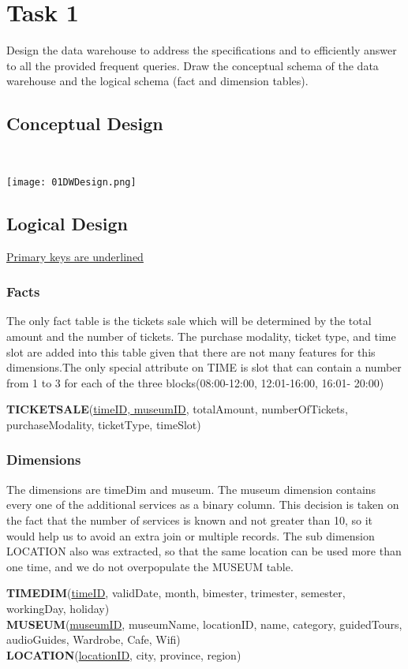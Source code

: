 \section{Task 1}

\begin{question}
    Design the data warehouse to address the specifications and to efficiently answer to all
    the provided frequent queries.
    Draw the conceptual schema of the data warehouse and the logical schema (fact and dimension tables).
\end{question}
\begin{answer}
    \subsection{Conceptual Design}
    \\
    \begin{center}
        \texttt{[image: 01DWDesign.png]}
    \end{center}
    \pagebreak
    \subsection{Logical Design}
    \underline{Primary keys are underlined}
    \subsubsection{Facts}
    The only fact table is the tickets sale which will be determined by the total amount and the number of tickets.
    The purchase modality, ticket type, and time slot are added into this table given that there are not many features
    for this dimensions.The only special attribute on TIME is slot that can contain a number from 1 to 3
    for each of the three blocks(08:00-12:00, 12:01-16:00, 16:01- 20:00)
    \par
    \textbf{TICKETSALE}(\underline{timeID, museumID}, totalAmount, numberOfTickets, purchaseModality, ticketType,
        timeSlot)
    \subsubsection{Dimensions}
    The dimensions are timeDim and museum. The museum dimension contains every one of the additional services as a binary
    column. This decision is taken on the fact that the number of services is known and not greater than 10, so it would
    help us to avoid an extra join or multiple records. The sub dimension LOCATION also was extracted, so that the same
    location can be used more than one time, and we do not overpopulate the MUSEUM table.
    \par
    \textbf{TIMEDIM}(\underline{timeID}, validDate, month, bimester, trimester, semester, workingDay, holiday) \\
    \textbf{MUSEUM}(\underline{museumID}, museumName, locationID, name, category, guidedTours, audioGuides, Wardrobe, Cafe,
    Wifi) \\
    \textbf{LOCATION}(\underline{locationID}, city, province, region) \\
\end{answer}
\pagebreak
